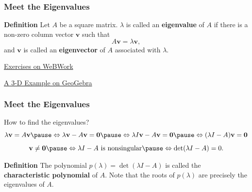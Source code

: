 \documentclass[10pt]{beamer}
\begin{document}
\begin{frame}
\frametitle{Meet the Eigenvalues}
\begin{tcolorbox}
{\bf Definition} Let $A$ be a square matrix. $\lambda$ is called an {\bf eigenvalue} of $A$ if there is a non-zero column vector $\mathbf v$ such that 
\[
A\mathbf v = \lambda\mathbf v,
\]
and $\mathbf v$ is called an {\bf eigenvector} of $A$ associated with $\lambda$.
\end{tcolorbox}\pause

\vspace{1em}
\href{https://webwork.messiah.edu/webwork2/MATH261_2025SP/Eigenvalues_and_Eigenvectors/1}{Exercises on WeBWork}

\vspace{1em}
\pause
\href{https://www.geogebra.org/3d/q9rzs2af}{A 3-D Example on GeoGebra}
\end{frame}

\begin{frame}
\frametitle{Meet the Eigenvalues}
How to find the eigenvalues?\pause
\[
\lambda\mathbf v = A\mathbf v\pause \Leftrightarrow \lambda\mathbf v - A\mathbf v = \mathbf 0\pause \Leftrightarrow
  \lambda I\mathbf v - A\mathbf v  = \mathbf 0 \pause \Leftrightarrow ( \lambda I - A)\mathbf v = \mathbf 0 \]
\pause
\[
\mathbf v \ne \mathbf 0\pause  \Leftrightarrow \lambda I - A\text{ is nonsingular}\pause \Leftrightarrow \det(\lambda I - A) = 0.
\]
\pause
\begin{tcolorbox}
{\bf Definition} The polynomial $p(\lambda) = \det(\lambda I - A)$ is called the {\bf characteristic polynomial} of $A$. Note that the roots of $p(\lambda)$ are precisely the eigenvalues of $A$.
\end{tcolorbox}
\end{frame}
\end{document}
